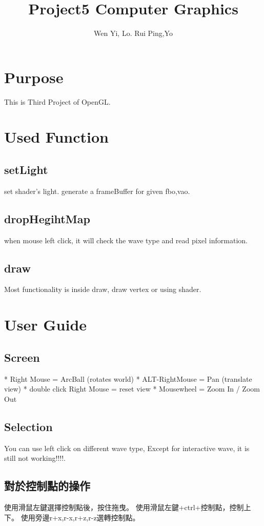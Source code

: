 \documentclass[12pt]{article}
\author{Wen Yi, Lo. Rui Ping,Yo}
\title{Project5 Computer Graphics}
\begin{document}
\begin{CJK*}{UTF8}{bsmi}
\maketitle

\tableofcontents

\newpage

\section{Purpose}
This is Third Project of OpenGL.
\section{Used Function}
	\subsection{setLight}
	set shader's light.
	generate a frameBuffer for given fbo,vao.
	\subsection{dropHegihtMap}
	when mouse left click, it will check the wave type and read pixel information.
	\subsection{draw}
	Most functionality is inside draw, draw vertex or using shader.
\section{User Guide}
	\subsection{Screen}
	* Right Mouse = ArcBall (rotates world)\newline
* ALT-RightMouse = Pan (translate view)\newline
* double click Right Mouse = reset view\newline
* Mousewheel = Zoom In / Zoom Out\newline
	\subsection{Selection}
	You can use left click on different wave type, Except for interactive wave, it is still not working!!!!.
	\subsection{對於控制點的操作}
	使用滑鼠左鍵選擇控制點後，按住拖曳。\newline
	使用滑鼠左鍵+ctrl+控制點，控制上下。\newline
	使用旁邊r+x,r-x,r+z,r-z選轉控制點。\newline

\end{CJK*}
\end{document}
